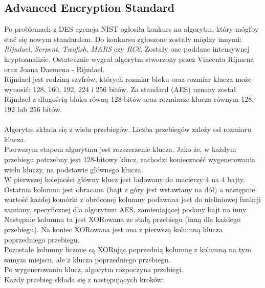 \subsection{Advanced Encryption Standard}
Po problemach z DES agencja NIST ogłosiła konkurs na algorytm, który mógłby stać się nowym standardem.
Do konkursu zgłoszone zostały między innymi: \textit{Rijndael}, \textit{Serpent}, \textit{Twofish}, \textit{MARS} czy \textit{RC6}. 
Zostały one poddane intensywnej kryptoanalizie. 
Ostatecznie wygrał algorytm stworzony przez Vincenta Rijmena oraz Joana Daemena - Rijndael. \\
Rijndael jest rodziną szyfrów, których rozmiar bloku oraz rozmiar klucza może wynosić: 128, 160, 192, 224 i 256 bitów. 
Za standard (AES) uznany został Rijndael z długością bloku równą 128 bitów oraz rozmiarze klucza równym 128, 192 lub 256 bitów. \\ \\
Algorytm składa się z wielu przebiegów. Liczba przebiegów zależy od rozmiaru klucza. \\
Pierwszym etapem algorytmu jest rozszerzenie klucza. 
Jako że, w każdym przebiegu potrzebny jest 128-bitowy klucz, zachodzi konieczność wygenerowania wielu kluczy, 
na podstawie głównego klucza. \\
W pierwszej kolejności główny klucz jest ładowany do macierzy 4 na 4 bajty. 
Ostatnia kolumna jest obracana (bajt z góry jest wstawiany na dół) a następnie 
wartość każdej komórki z obróconej kolumny podawana jest do nieliniowej funkcji zamiany, 
specyficznej dla algorytmu AES, zamieniającej podany bajt na inny.
Następnie kolumna ta jest XORowana ze stałą przebiegu (inną dla każdego przebiegu). 
Na koniec XORowana jest ona z pierwszą kolumną klucza poprzedniego przebiegu. \\
Pozostałe kolumny liczone są XORując poprzednią kolumnę z kolumną na tym samym miejscu, ale z klucza poprzedniego przebiegu. \\ 
Po wygenerowaniu klucz, algorytm rozpoczyna przebiegi. \\
Każdy przebieg składa się z następujących kroków:
